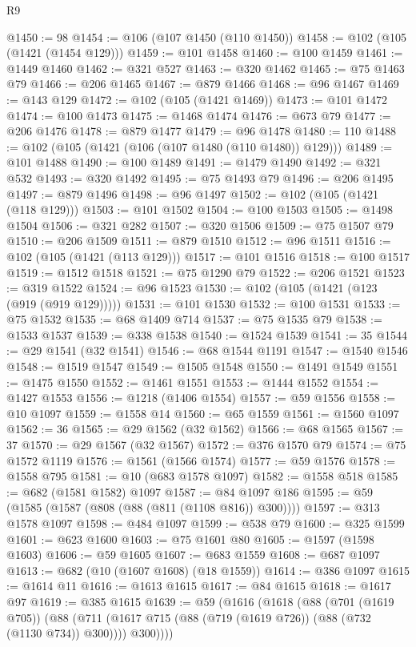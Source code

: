 \begin{lexlean}{R9}
\begin{coremodule}
@1450 := 98
@1454 := @106 (@107 @1450 (@110 @1450))
@1458 := @102 (@105 (@1421 (@1454 @129)))
@1459 := @101 @1458
@1460 := @100 @1459
@1461 := @1449 @1460
@1462 := @321 @527
@1463 := @320 @1462
@1465 := @75 @1463 @79
@1466 := @206 @1465
@1467 := @879 @1466
@1468 := @96 @1467
@1469 := @143 @129
@1472 := @102 (@105 (@1421 @1469))
@1473 := @101 @1472
@1474 := @100 @1473
@1475 := @1468 @1474
@1476 := @673 @79
@1477 := @206 @1476
@1478 := @879 @1477
@1479 := @96 @1478
@1480 := 110
@1488 := @102 (@105 (@1421 (@106 (@107 @1480 (@110 @1480)) @129)))
@1489 := @101 @1488
@1490 := @100 @1489
@1491 := @1479 @1490
@1492 := @321 @532
@1493 := @320 @1492
@1495 := @75 @1493 @79
@1496 := @206 @1495
@1497 := @879 @1496
@1498 := @96 @1497
@1502 := @102 (@105 (@1421 (@118 @129)))
@1503 := @101 @1502
@1504 := @100 @1503
@1505 := @1498 @1504
@1506 := @321 @282
@1507 := @320 @1506
@1509 := @75 @1507 @79
@1510 := @206 @1509
@1511 := @879 @1510
@1512 := @96 @1511
@1516 := @102 (@105 (@1421 (@113 @129)))
@1517 := @101 @1516
@1518 := @100 @1517
@1519 := @1512 @1518
@1521 := @75 @1290 @79
@1522 := @206 @1521
@1523 := @319 @1522
@1524 := @96 @1523
@1530 := @102 (@105 (@1421 (@123 (@919 (@919 @129)))))
@1531 := @101 @1530
@1532 := @100 @1531
@1533 := @75 @1532
@1535 := @68 @1409 @714
@1537 := @75 @1535 @79
@1538 := @1533 @1537
@1539 := @338 @1538
@1540 := @1524 @1539
@1541 := 35
@1544 := @29 @1541 (@32 @1541)
@1546 := @68 @1544 @1191
@1547 := @1540 @1546
@1548 := @1519 @1547
@1549 := @1505 @1548
@1550 := @1491 @1549
@1551 := @1475 @1550
@1552 := @1461 @1551
@1553 := @1444 @1552
@1554 := @1427 @1553
@1556 := @1218 (@1406 @1554)
@1557 := @59 @1556
@1558 := @10 @1097
@1559 := @1558 @14
@1560 := @65 @1559
@1561 := @1560 @1097
@1562 := 36
@1565 := @29 @1562 (@32 @1562)
@1566 := @68 @1565
@1567 := 37
@1570 := @29 @1567 (@32 @1567)
@1572 := @376 @1570 @79
@1574 := @75 @1572 @1119
@1576 := @1561 (@1566 @1574)
@1577 := @59 @1576
@1578 := @1558 @795
@1581 := @10 (@683 @1578 @1097)
@1582 := @1558 @518
@1585 := @682 (@1581 @1582) @1097
@1587 := @84 @1097 @186
@1595 := @59 (@1585 (@1587 (@808 (@88 (@811 (@1108 @816)) @300))))
@1597 := @313 @1578 @1097
@1598 := @484 @1097
@1599 := @538 @79
@1600 := @325 @1599
@1601 := @623 @1600
@1603 := @75 @1601 @80
@1605 := @1597 (@1598 @1603)
@1606 := @59 @1605
@1607 := @683 @1559
@1608 := @687 @1097
@1613 := @682 (@10 (@1607 @1608) (@18 @1559))
@1614 := @386 @1097
@1615 := @1614 @11
@1616 := @1613 @1615
@1617 := @84 @1615
@1618 := @1617 @97
@1619 := @385 @1615
@1639 := @59
    (@1616
      (@1618
        (@88
          (@701 (@1619 @705))
          (@88 (@711 (@1617 @715 (@88 (@719 (@1619 @726)) (@88 (@732 (@1130 @734)) @300)))) @300))))

\end{coremodule}
\end{lexlean}
